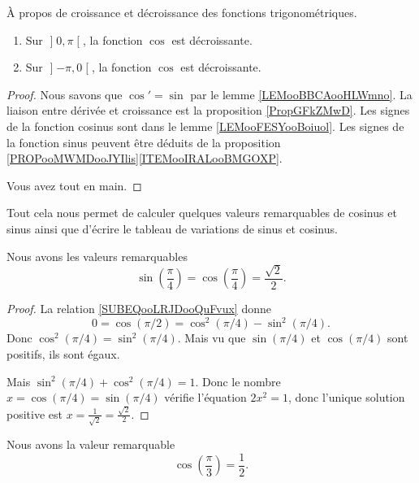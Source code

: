 \begin{lemma}        \label{LEMooBIPFooQNiTqZ}
	À propos de croissance et décroissance des fonctions trigonométriques.
	\begin{enumerate}
		\item
		      Sur \( \mathopen] 0 , \pi \mathclose[\), la fonction \( \cos\) est décroissante.
		\item
		      Sur \( \mathopen] -\pi , 0 \mathclose[\), la fonction \( \cos\) est décroissante.
	\end{enumerate}
\end{lemma}

\begin{proof}
	Nous savons que \( \cos'=\sin\) par le lemme \ref{LEMooBBCAooHLWmno}. La liaison entre dérivée et croissance est la proposition \ref{PropGFkZMwD}. Les signes de la fonction cosinus sont dans le lemme \ref{LEMooFESYooBoiuol}. Les signes de la fonction sinus peuvent être déduits de la proposition \ref{PROPooMWMDooJYIlis}\ref{ITEMooIRALooBMGOXP}.

	Vous avez tout en main.
\end{proof}

Tout cela nous permet de calculer quelques valeurs remarquables de cosinus et sinus ainsi que d'écrire le tableau de variations de sinus et cosinus.

\begin{lemma}       \label{LEMooIGNPooPEctJy}
	Nous avons les valeurs remarquables
	\begin{equation}
		\sin(\frac{ \pi }{ 4 })=\cos(\frac{ \pi }{ 4 })=\frac{ \sqrt{ 2 } }{2}.
	\end{equation}
\end{lemma}

\begin{proof}
	La relation \eqref{SUBEQooLRJDooQuFvux} donne
	\begin{equation}
		0=\cos(\pi/2)=\cos^2(\pi/4)-\sin^2(\pi/4).
	\end{equation}
	Donc \( \cos^2(\pi/4)=\sin^2(\pi/4)\). Mais vu que \( \sin(\pi/4)\) et \( \cos(\pi/4)\) sont positifs, ils sont égaux.

	Mais \( \sin^2(\pi/4)+\cos^2(\pi/4)=1\). Donc le nombre \( x=\cos(\pi/4)=\sin(\pi/4)\) vérifie l'équation \( 2x^2=1\), donc l'unique solution positive est \( x=\frac{1}{ \sqrt{ 2 } }=\frac{ \sqrt{ 2 } }{2}\).
\end{proof}

\begin{lemma}       \label{LEMooRMHAooDEAPMw}
	Nous avons la valeur remarquable
	\begin{equation}
		\cos(\frac{ \pi }{ 3 })=\frac{ 1 }{2}.
	\end{equation}
\end{lemma}

